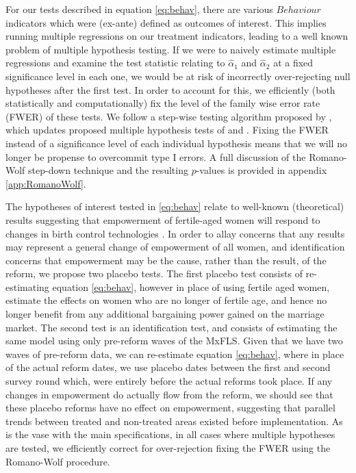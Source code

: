 \documentclass[a4paper,11pt]{article}
\begin{document}
\begin{spacing}{1.5}
For our tests described in equation \ref{eq:behav}, there are various $Behaviour$ indicators which were (ex-ante) defined as outcomes of interest.  This implies running multiple regressions on our treatment indicators, leading to a well known problem of multiple hypothesis testing.  If we were to naively estimate multiple regressions and examine the test statistic relating to $\widehat\alpha_1$ and $\widehat\alpha_2$ at a fixed significance level in each one, we would be at risk of incorrectly over-rejecting null hypotheses after the first test.  In order to account for this, we efficiently (both statistically and computationally) fix the level of the family wise error rate (FWER) of these tests.  We follow a step-wise testing algorithm proposed by \citet{RomanoWolf2005,RomanoWolf2005b}, which updates proposed multiple hypothesis tests of \citet{Bonferroni1935} and \citet{Holm1979}.  Fixing the FWER instead of a significance level of each individual hypothesis means that we will no longer be propense to overcommit type I errors.  A full discussion of the Romano-Wolf step-down technique and the resulting $p$-values is provided in appendix \ref{app:RomanoWolf}.

The hypotheses of interest tested in \ref{eq:behav} relate to well-known (theoretical) results suggesting that empowerment of fertile-aged women will respond to changes in birth control technologies \citep{ChiapporiOreffice2008}.  In order to allay concerns that any results may represent a general change of empowerment of all women, and identification concerns that empowerment may be the cause, rather than the result, of the reform, we propose two placebo tests.  The first placebo test consists of re-estimating equation \ref{eq:behav}, however in place of using fertile aged women, estimate the effects on women who are no longer of fertile age, and hence no longer benefit from any additional bargaining power gained on the marriage market.  The second test is an identification test, and consists of estimating the same model using only pre-reform waves of the MxFLS.  Given that we have two waves of pre-reform data, we can re-estimate equation \ref{eq:behav}, where in place of the actual reform dates, we use placebo dates between the first and second survey round which, were entirely before the actual reforms took place.  If any changes in empowerment do actually flow from the reform, we should see that these placebo reforms have no effect on empowerment, suggesting that parallel trends between treated and non-treated areas existed before implementation.  As is the vase with the main specifications, in all cases where multiple hypotheses are tested, we efficiently correct for over-rejection fixing the FWER using the Romano-Wolf procedure.




\end{spacing}
\end{document}
